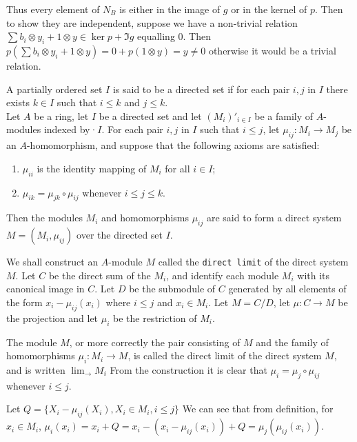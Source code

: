 \documentclass[a4paper]{exam}
\begin{document}
\begin{questions}
\begin{solution}
		Thus every element of $N_B$ is either in the image of $g$ or in the kernel of $p$.
		Then to show they are independent, suppose we have a non-trivial relation $\sum b_i \otimes y_i + 1 \otimes y \in \ker p + \Im g$ equalling 0.
		Then $p(\sum b_i \otimes y_i + 1 \otimes y) = 0 + p(1 \otimes y) = y \ne 0$ otherwise it would be a trivial relation.
	\end{solution}

	\question A partially ordered set $I$ is said to be a directed set if for each pair $i, j$ in $I$ there exists $k \in I$ such that $i\le k$ and $j\le k$.\\
	Let $A$ be a ring, let $I$ be a directed set and let $(M_i)'_{i\in I}$ be a family of $A$-modules indexed by·$I$. For each pair $i,j$ in $I$ such that $i \le j $, let $\mu _{ij}: M_i \to M_j$ be an $A$-homomorphism, and suppose that the following axioms are satisfied:
	\begin{enumerate}
		\item $\mu_{ii}$ is the identity mapping of $M_i$ for all $i\in I $;
		\item $\mu _{ik} = \mu _{jk}\circ \mu _{ij}$ whenever $i\le j \le k$.
	\end{enumerate}
	Then the modules $M_i$ and homomorphisms $\mu_{ij}$ are said to form a direct system $M = (M_i, \mu _{ij})$ over the directed set $I$.

	We shall construct an $A$-module $M$ called the \texttt{direct limit} of the direct system $M$. Let $C$ be the direct sum of the $M_i $, and identify each module $M_i$ with its canonical image in $C$. Let $D$ be the submodule of $C$ generated by all elements of the form $x_i - \mu _{ij}(x_i)$ where $i\le j$ and $x_i\in M_i$. Let $M = C / D $, let $\mu :C\to M$ be the projection and let $\mu _i$ be the restriction of $M_i$.

	The module $M $, or more correctly the pair consisting of $M$ and the family of homomorphisms $\mu _i:M_i \to M $, is called the direct limit of the direct system $M $, and is written $\lim_{\rightarrow} M_i$ From the construction it is clear that $\mu _i = \mu _j \circ \mu _{ij}$ whenever $i\le j$.
	\begin{solution}
		Let $Q = \{X_i - \mu _{ij}(X_i), X_i \in M_i, i\le j\}$
		We can see that from definition, for $x_i \in M_i $, $\mu _i(x_i) = x_i + Q = x_i - (x_i - \mu_{ij}(x_i)) + Q = \mu_j(\mu_{ij}(x_i))$.
	\end{solution}


\end{questions}
\end{document}
